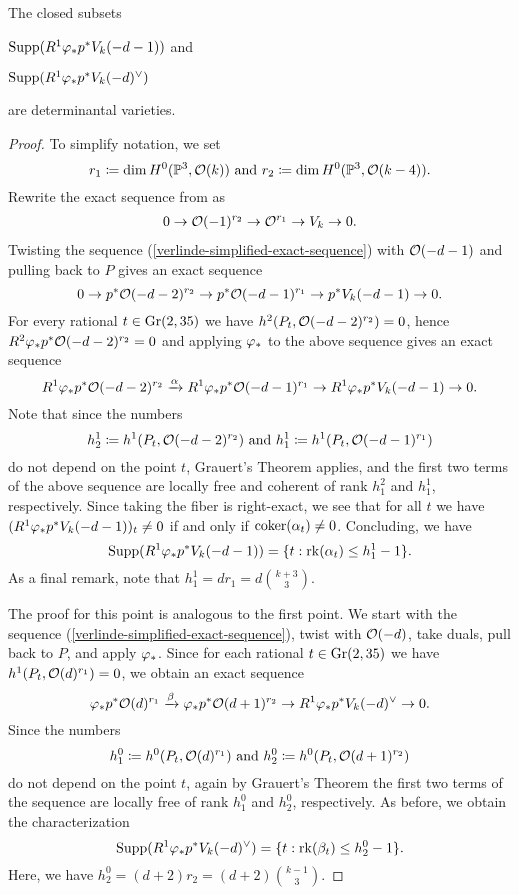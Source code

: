 \begin{proposition}
The closed subsets

$\operatorname{Supp}(R^1 \varphi_{*}p^{*} V_{k}(-d-1))$ and

$\operatorname{Supp}(R^1 \varphi_{*}p^{*} V_{k}(-d)^\vee)$ 

are determinantal varieties.
\end{proposition}
\begin{proof}
To simplify notation, we set
\[r_1 \coloneqq \dim H^0(\mathbb{P}^3, \mathcal{O}(k))
\text{ and }
r_2 \coloneqq \dim H^0(\mathbb{P}^3, \mathcal{O}(k-4)).\]
Rewrite the exact sequence from  as
\begin{align}
0 \to \mathcal{O}(-1)^{r_2} \to \mathcal{O}^{r_1} \to V_k \to 0. \label{verlinde-simplified-exact-sequence}
\end{align}
 Twisting the sequence (\ref{verlinde-simplified-exact-sequence}) with $\mathcal{O}(-d-1)$ and pulling back to $P$ gives an exact sequence
\[
0
\to  {p^{*}\mathcal{O}(-d-2)^{r_2}}
\to  {p^{*}\mathcal{O}(-d-1)^{r_1}}
\to  {p^{*}V_k(-d-1)}
\to  0.
\]
For every rational $t\in \operatorname{Gr}(2,35)$ we have
$h^2(P_t, \mathcal{O}(-d-2)^{r_2}) = 0$,
hence
$R^2\varphi_{*}p^{*}\mathcal{O}(-d-2)^{r_2} = 0$
and applying $\varphi_{*}$ to the above sequence gives an exact sequence
\[
R^1\varphi_{*}p^{*}\mathcal{O}(-d-2)^{r_2}
\xrightarrow{\alpha}
R^1\varphi_{*}p^{*}\mathcal{O}(-d-1)^{r_1} 
\to
R^1\varphi_{*}p^{*} V_k(-d-1)
\to 0.
\]
Note that since the numbers
\[
h^{1}_{2}\coloneqq h^1(P_t, \mathcal{O}(-d-2)^{r_2})
\text{ and }
h_{1}^{1}\coloneqq h^1(P_t, \mathcal{O}(-d-1)^{r_1})
\]
do not depend on the point $t$, Grauert's Theorem applies, and the first two terms of the above sequence are locally free and coherent of rank $h_1^2$ and $h_1^1$, respectively. Since taking the fiber is right-exact, we see that for all $t$ we have
$(R^1\varphi_{*}p^{*} V_k(-d-1))_t \neq 0$ if and only if $\operatorname{coker}(\alpha_t) \neq 0$. Concluding, we have
\[
\operatorname{Supp}(R^1\varphi_{*}p^{*} V_k(-d-1))
= \{t : \operatorname{rk} (\alpha_t)\leq h^{1}_1 - 1\}.
\]
As a final remark, note that $h^1_1 = d r_1 = d \binom{k+3}{3}.$

 The proof for this point is analogous to the first point. We start with the sequence (\ref{verlinde-simplified-exact-sequence}), twist with $\mathcal{O}(-d)$, take duals, pull back to $P$, and apply $\varphi_{*}$. Since for each rational $t\in \operatorname{Gr}(2,35)$ we have $h^1(P_t, \mathcal{O}(d)^{r_1})=0$, we obtain an exact sequence
\[
	{\varphi_{*}p^{*}\mathcal{O}(d)^{r_1} }
\xrightarrow{\beta}	{\varphi_{*}p^{*}\mathcal{O}(d+1)^{r_2}}
\to	{R^1 \varphi_{*}p^{*} V_{k}(-d)^\vee}
\to 0.
\]
Since the numbers \[h^0_1 \coloneqq h^0(P_t,\mathcal{O}(d)^{r_1}) \text{ and }
h^0_2 \coloneqq h^0(P_t, \mathcal{O}(d+1)^{r_2})\] do not depend on the point $t$, again by Grauert's Theorem the first two terms of the sequence are locally free of rank $h^0_1$ and $h^0_2$, respectively. As before, we obtain the characterization
\[
	\operatorname{Supp}(R^1 \varphi_{*}p^{*} V_{k}(-d)^\vee)
	= \{t : \operatorname{rk} (\beta_t)\leq h^{0}_2 - 1\}.
\]
Here, we have $h_2^0 = (d+2)r_2 = (d+2)\binom{k-1}{3}.$
\end{proof}